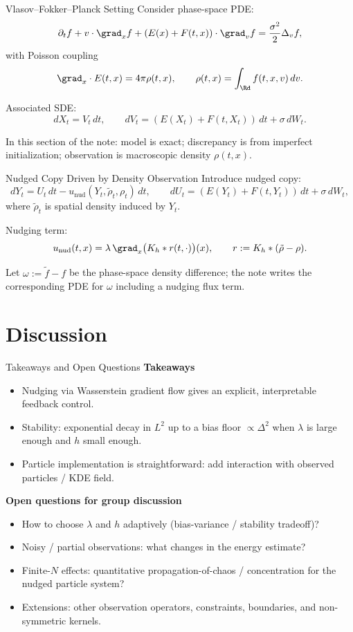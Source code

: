 \documentclass[aspectratio=169]{beamer}
\begin{document}
\begin{frame}{Vlasov--Fokker--Planck Setting}
Consider phase-space PDE:
\[
\partial_t f + v\cdot \grad_x f + (E(x)+F(t,x))\cdot \grad_v f
= \frac{\sigma^2}{2}\Delta_v f,
\]
with Poisson coupling
\[
\grad_x\cdot E(t,x)=4\pi \rho(t,x),\qquad \rho(t,x)=\int_{\Rd} f(t,x,v)\,dv.
\]

Associated SDE:
\[
dX_t = V_t\,dt,\qquad
dV_t = (E(X_t)+F(t,X_t))\,dt + \sigma\, dW_t.
\]

In this section of the note: model is exact; discrepancy is from imperfect initialization; observation is macroscopic density $\rho(t,x)$.
\end{frame}

\begin{frame}{Nudged Copy Driven by Density Observation}
Introduce nudged copy:
\[
dY_t = U_t\,dt - u_{\text{nud}}(Y_t,\tilde\rho_t,\rho_t)\,dt,
\qquad
dU_t = (E(Y_t)+F(t,Y_t))\,dt + \sigma\, dW_t,
\]
where $\tilde\rho_t$ is spatial density induced by $Y_t$.

\medskip
Nudging term:
\[
u_{\text{nud}}(t,x)=\lambda\,\grad_x\big(K_h*r(t,\cdot)\big)(x),
\qquad r := K_h*(\tilde\rho-\rho).
\]

Let $\omega := \tilde f - f$ be the phase-space density difference; the note writes the corresponding PDE for $\omega$ including a nudging flux term.
\end{frame}

\section{Discussion}

\begin{frame}{Takeaways and Open Questions}
\textbf{Takeaways}
\begin{itemize}
  \item Nudging via Wasserstein gradient flow gives an explicit, interpretable feedback control.
  \item Stability: exponential decay in $L^2$ up to a bias floor $\propto \Delta^2$ when $\lambda$ is large enough and $h$ small enough.
  \item Particle implementation is straightforward: add interaction with observed particles / KDE field.
\end{itemize}

\medskip
\textbf{Open questions for group discussion}
\begin{itemize}
  \item How to choose $\lambda$ and $h$ adaptively (bias-variance / stability tradeoff)?
  \item Noisy / partial observations: what changes in the energy estimate?
  \item Finite-$N$ effects: quantitative propagation-of-chaos / concentration for the nudged particle system?
  \item Extensions: other observation operators, constraints, boundaries, and non-symmetric kernels.
\end{itemize}
\end{frame}
\end{document}
